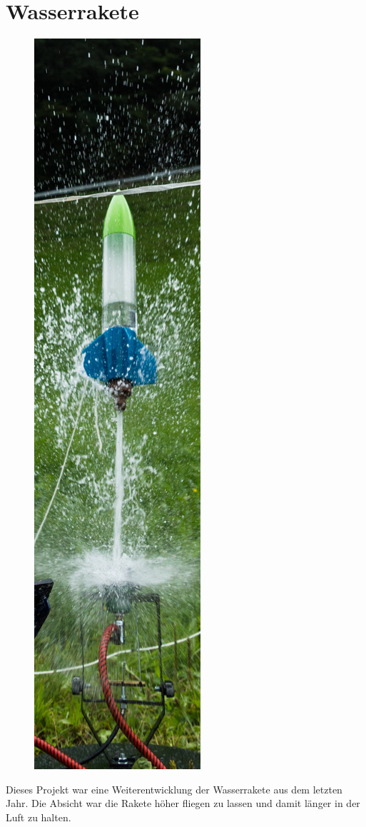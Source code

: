 \documentclass[
  captions=tableheading,  %
  titlepage=false, %
  twocolumn,
  headings=small,
]{scrartcl}
\begin{document}
\section*{Wasserrakete}
\begin{figure}
  \centering
  \includegraphics[width=\linewidth]{./images/wasserrakete_schmal.JPG}
\end{figure}
Dieses Projekt war eine Weiterentwicklung der Wasserrakete aus dem letzten Jahr.
Die Absicht war die Rakete höher fliegen zu lassen und damit länger in der Luft zu halten.
\end{document}
